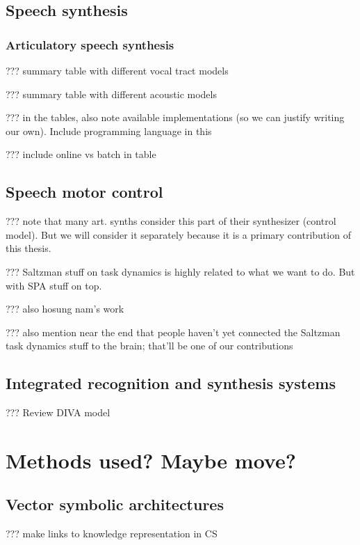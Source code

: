 \subsection{Speech synthesis}

\subsubsection{Articulatory speech synthesis}

??? summary table with different vocal tract models

??? summary table with different acoustic models

??? in the tables, also note available implementations
(so we can justify writing our own).
Include programming language in this

??? include online vs batch in table

\subsection{Speech motor control}

??? note that many art. synths consider this part of their
synthesizer (control model).
But we will consider it separately because
it is a primary contribution of this thesis.

??? Saltzman stuff on task dynamics
is highly related to what we want to do.
But with SPA stuff on top.

??? also hosung nam's work

??? also mention near the end that people haven't
yet connected the Saltzman task dynamics stuff
to the brain; that'll be one of our contributions

\subsection{Integrated recognition and synthesis systems}

??? Review DIVA model

\section{Methods used? Maybe move?}

\subsection{Vector symbolic architectures}

??? make links to knowledge representation in CS

